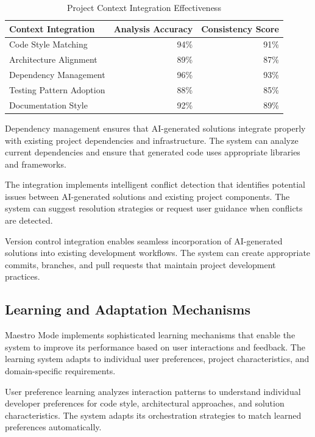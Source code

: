 \begin{table}[ht]
\centering
\begin{tabular}{@{}lrr@{}}
\toprule
\textbf{Context Integration} & \textbf{Analysis Accuracy} & \textbf{Consistency Score} \\
\midrule
Code Style Matching & 94\% & 91\% \\
Architecture Alignment & 89\% & 87\% \\
Dependency Management & 96\% & 93\% \\
Testing Pattern Adoption & 88\% & 85\% \\
Documentation Style & 92\% & 89\% \\
\bottomrule
\end{tabular}
\caption{Project Context Integration Effectiveness}
\end{table}

Dependency management ensures that AI-generated solutions integrate properly with existing project dependencies and infrastructure. The system can analyze current dependencies and ensure that generated code uses appropriate libraries and frameworks.

The integration implements intelligent conflict detection that identifies potential issues between AI-generated solutions and existing project components. The system can suggest resolution strategies or request user guidance when conflicts are detected.

Version control integration enables seamless incorporation of AI-generated solutions into existing development workflows. The system can create appropriate commits, branches, and pull requests that maintain project development practices.

\subsection*{Learning and Adaptation Mechanisms}

Maestro Mode implements sophisticated learning mechanisms that enable the system to improve its performance based on user interactions and feedback. The learning system adapts to individual user preferences, project characteristics, and domain-specific requirements.

User preference learning analyzes interaction patterns to understand individual developer preferences for code style, architectural approaches, and solution characteristics. The system adapts its orchestration strategies to match learned preferences automatically.

